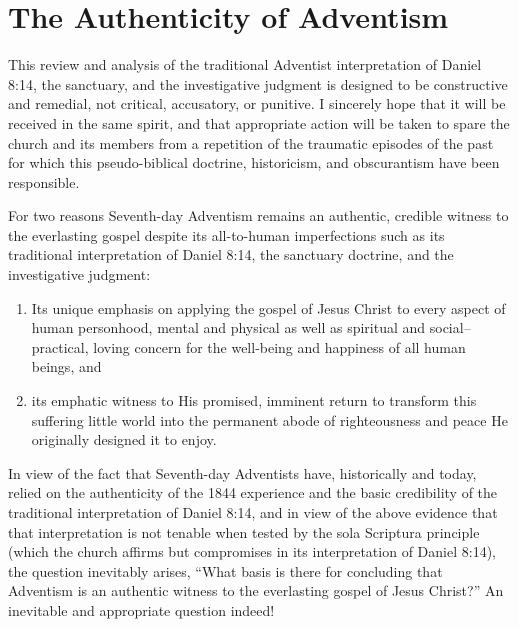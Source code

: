 \chapter{The Authenticity of Adventism}
\label{ch:authenticity}

This review and analysis of the traditional Adventist interpretation of
Daniel 8:14, the sanctuary, and the investigative judgment is designed to be
constructive and remedial, not critical, accusatory, or punitive. I
sincerely hope that it will be received in the same spirit, and that
appropriate action will be taken to spare the church and its members from a
repetition of the traumatic episodes of the past for which this
pseudo-biblical doctrine, historicism, and obscurantism have been
responsible.

For two reasons Seventh-day Adventism remains an authentic, credible witness
to the everlasting gospel despite its all-to-human imperfections such as its
traditional interpretation of Daniel 8:14, the sanctuary doctrine, and the
investigative judgment:
\begin{enumerate}
\item Its unique emphasis on applying the gospel of
Jesus Christ to every aspect of human personhood, mental and physical as
well as spiritual and social--practical, loving concern for the well-being
and happiness of all human beings, and 
\item its emphatic witness to His
promised, imminent return to transform this suffering little world into the
permanent abode of righteousness and peace He originally designed it to
enjoy.
\end{enumerate}

In view of the fact that Seventh-day Adventists have, historically and
today, relied on the authenticity of the 1844 experience and the basic
credibility of the traditional interpretation of Daniel 8:14, and in view of
the above evidence that that interpretation is not tenable when tested by
the sola Scriptura principle (which the church affirms but compromises in
its interpretation of Daniel 8:14), the question inevitably arises, ``What
basis is there for concluding that Adventism is an authentic witness to the
everlasting gospel of Jesus Christ?'' An inevitable and appropriate question
indeed!

